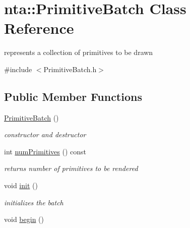 \hypertarget{classnta_1_1PrimitiveBatch}{}\section{nta\+:\+:Primitive\+Batch Class Reference}
\label{classnta_1_1PrimitiveBatch}


represents a collection of primitives to be drawn  




{\ttfamily \#include $<$Primitive\+Batch.\+h$>$}

\subsection*{Public Member Functions}
\begin{DoxyCompactItemize}
\item 
\mbox{\label{classnta_1_1PrimitiveBatch_a28628a90db31796dd0d1cf770dbe9ff5}} 
\hyperlink{classnta_1_1PrimitiveBatch_a28628a90db31796dd0d1cf770dbe9ff5}{Primitive\+Batch} ()
\begin{DoxyCompactList}\small\item\em constructor and destructor \end{DoxyCompactList}\item 
\mbox{\label{classnta_1_1PrimitiveBatch_a3cf74d5aaf9e56b0d98512ba8b94d01f}} 
int \hyperlink{classnta_1_1PrimitiveBatch_a3cf74d5aaf9e56b0d98512ba8b94d01f}{num\+Primitives} () const
\begin{DoxyCompactList}\small\item\em returns number of primitives to be rendered \end{DoxyCompactList}\item 
\mbox{\label{classnta_1_1PrimitiveBatch_a425c70802333e18a6cd019aec145f07b}} 
void \hyperlink{classnta_1_1PrimitiveBatch_a425c70802333e18a6cd019aec145f07b}{init} ()
\begin{DoxyCompactList}\small\item\em initializes the batch \end{DoxyCompactList}\item 
\mbox{\label{classnta_1_1PrimitiveBatch_a589f1ebad11f83187f2ce8f81875fe22}} 
void \hyperlink{classnta_1_1PrimitiveBatch_a589f1ebad11f83187f2ce8f81875fe22}{begin} ()

\end{DoxyCompactItemize}
